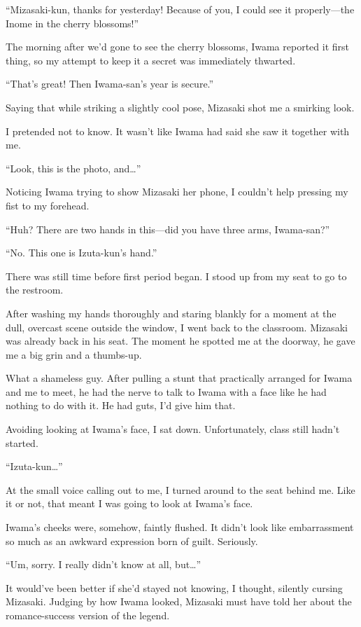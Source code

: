 \documentclass[
    a4paper,
    12pt,
    twoside,
    openany,
    UTF8,
    fontset=windows
]{ctexbook}
\begin{document}
``Mizasaki-kun, thanks for yesterday! Because of you, I could see it properly---the Inome in the cherry blossoms!''

The morning after we'd gone to see the cherry blossoms, Iwama reported it first thing, so my attempt to keep it a secret was immediately thwarted.

``That's great! Then Iwama-san's year is secure.''

Saying that while striking a slightly cool pose, Mizasaki shot me a smirking look.

I pretended not to know. It wasn't like Iwama had said she saw it together with me.

``Look, this is the photo, and\dots''

Noticing Iwama trying to show Mizasaki her phone, I couldn't help pressing my fist to my forehead.

``Huh? There are two hands in this---did you have three arms, Iwama-san?''

``No. This one is Izuta-kun's hand.''

There was still time before first period began. I stood up from my seat to go to the restroom.

After washing my hands thoroughly and staring blankly for a moment at the dull, overcast scene outside the window, I went back to the classroom. Mizasaki was already back in his seat. The moment he spotted me at the doorway, he gave me a big grin and a thumbs-up.

What a shameless guy. After pulling a stunt that practically arranged for Iwama and me to meet, he had the nerve to talk to Iwama with a face like he had nothing to do with it. He had guts, I'd give him that.

Avoiding looking at Iwama's face, I sat down. Unfortunately, class still hadn't started.

``Izuta-kun\dots''

At the small voice calling out to me, I turned around to the seat behind me. Like it or not, that meant I was going to look at Iwama's face.

Iwama's cheeks were, somehow, faintly flushed. It didn't look like embarrassment so much as an awkward expression born of guilt. Seriously.

``Um, sorry. I really didn't know at all, but\dots''

It would've been better if she'd stayed not knowing, I thought, silently cursing Mizasaki. Judging by how Iwama looked, Mizasaki must have told her about the romance-success version of the legend.
\end{document}
